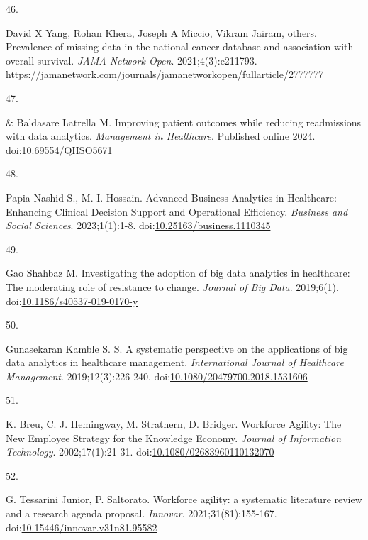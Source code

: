 \documentclass[
  american,
  11pt,
  letterpaper,
  oneside  ,captions=tableheading
]{scrartcl}
\newlength{\cslhangindent}
\newlength{\csllabelwidth}
\newenvironment{CSLReferences}[2] %
 {\begin{list}{}{%
  \setlength{\itemindent}{0pt}
  \setlength{\leftmargin}{0pt}
  \setlength{\parsep}{0pt}
  \ifodd #1
   \setlength{\leftmargin}{\cslhangindent}
   \setlength{\itemindent}{-1\cslhangindent}
  \fi
  \setlength{\itemsep}{#2\baselineskip}}}
 {\end{list}}
\newcommand{\CSLLeftMargin}[1]{\parbox[t]{\csllabelwidth}{\strut#1\strut}}
\newcommand{\CSLRightInline}[1]{\parbox[t]{\linewidth - \csllabelwidth}{\strut#1\strut}}
\begin{document}
\begin{CSLReferences}{0}{1}
\CSLLeftMargin{46. }%
\CSLRightInline{David X Yang, Rohan Khera, Joseph A Miccio, Vikram
Jairam, others. {Prevalence of missing data in the national cancer
database and association with overall survival}. \emph{JAMA Network
Open}. 2021;4(3):e211793.
\url{https://jamanetwork.com/journals/jamanetworkopen/fullarticle/2777777}}

\CSLLeftMargin{47. }%
\CSLRightInline{\& Baldasare Latrella M. {Improving patient outcomes
while reducing readmissions with data analytics}. \emph{Management in
Healthcare}. Published online 2024.
doi:\href{https://doi.org/10.69554/QHSO5671}{10.69554/QHSO5671}}

\CSLLeftMargin{48. }%
\CSLRightInline{Papia Nashid S., M. I. Hossain. {Advanced Business
Analytics in Healthcare: Enhancing Clinical Decision Support and
Operational Efficiency}. \emph{Business and Social Sciences}.
2023;1(1):1-8.
doi:\href{https://doi.org/10.25163/business.1110345}{10.25163/business.1110345}}

\CSLLeftMargin{49. }%
\CSLRightInline{Gao Shahbaz M. {Investigating the adoption of big data
analytics in healthcare: The moderating role of resistance to change}.
\emph{Journal of Big Data}. 2019;6(1).
doi:\href{https://doi.org/10.1186/s40537-019-0170-y}{10.1186/s40537-019-0170-y}}

\CSLLeftMargin{50. }%
\CSLRightInline{Gunasekaran Kamble S. S. {A systematic perspective on
the applications of big data analytics in healthcare management}.
\emph{International Journal of Healthcare Management}.
2019;12(3):226-240.
doi:\href{https://doi.org/10.1080/20479700.2018.1531606}{10.1080/20479700.2018.1531606}}

\CSLLeftMargin{51. }%
\CSLRightInline{K. Breu, C. J. Hemingway, M. Strathern, D. Bridger.
{Workforce Agility: The New Employee Strategy for the Knowledge
Economy}. \emph{Journal of Information Technology}. 2002;17(1):21-31.
doi:\href{https://doi.org/10.1080/02683960110132070}{10.1080/02683960110132070}}

\CSLLeftMargin{52. }%
\CSLRightInline{G. Tessarini Junior, P. Saltorato. {Workforce agility: a
systematic literature review and a research agenda proposal}.
\emph{Innovar}. 2021;31(81):155-167.
doi:\href{https://doi.org/10.15446/innovar.v31n81.95582}{10.15446/innovar.v31n81.95582}}


\end{CSLReferences}
\end{document}
